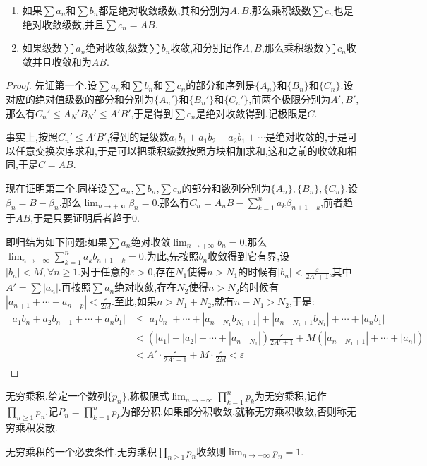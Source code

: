\begin{enumerate}
	\item 如果$\sum a_n$和$\sum b_n$都是绝对收敛级数,其和分别为$A,B$,那么乘积级数$\sum c_n$也是绝对收敛级数,并且$\sum c_n=AB$.
	\item 如果级数$\sum a_n$绝对收敛,级数$\sum b_n$收敛,和分别记作$A,B$,那么乘积级数$\sum c_n$收敛并且收敛和为$AB$.
\end{enumerate}
\begin{proof}
	
	先证第一个.设$\sum a_n$和$\sum b_n$和$\sum c_n$的部分和序列是$\{A_n\}$和$\{B_n\}$和$\{C_n\}$.设对应的绝对值级数的部分和分别为$\{A_n'\}$和$\{B_n'\}$和$\{C_n'\}$,前两个极限分别为$A',B'$,那么有$C_n'\le A_N'B_N'\le A'B'$,于是得到$\sum c_n$是绝对收敛得到.记极限是$C$.
	
	事实上,按照$C_n'\le A'B'$,得到的是级数$a_1b_1+a_1b_2+a_2b_1+\cdots$是绝对收敛的,于是可以任意交换次序求和,于是可以把乘积级数按照方块相加求和,这和之前的收敛和相同,于是$C=AB$.
	
	现在证明第二个.同样设$\sum a_n$,$\sum b_n$,$\sum c_n$的部分和数列分别为$\{A_n\},\{B_n\},\{C_n\}$.设$\beta_n=B-\beta_n$,那么$\lim_{n\to+\infty}\beta_n=0$.那么有$C_n=A_nB-\sum_{k=1}^{n}a_k\beta_{n+1-k}$,前者趋于$AB$,于是只要证明后者趋于0.
	
	即归结为如下问题:如果$\sum a_n$绝对收敛$\lim_{n\to+\infty}b_n=0$,那么$\lim_{n\to+\infty}\sum_{k=1}^{n}a_kb_{n+1-k}=0$.为此,先按照$b_n$收敛得到它有界,设$|b_n|<M,\forall n\ge1$.对于任意的$\varepsilon>0$,存在$N_1$使得$n>N_1$的时候有$|b_n|<\frac{\varepsilon}{2A'+1}$,其中$A'=\sum |a_n|$.再按照$\sum a_n$绝对收敛,存在$N_2$使得$n>N_2$的时候有$|a_{n+1}+\cdots+a_{n+p}|<\frac{\varepsilon}{2M}$.至此,如果$n>N_1+N_2$,就有$n-N_1>N_2$,于是:
	\begin{align*}
	|a_1b_n+a_2b_{n-1}+\cdots+a_nb_1| &\le|a_1b_n|+\cdots+|a_{n-N_1}b_{N_1+1}|+|a_{n-N_1+1}b_{N_1}|+\cdots+|a_nb_1| \\
	&<(|a_1|+|a_2|+\cdots+|a_{n-N_1}|)\frac{\varepsilon}{2A'+1}+M\left(|a_{n-N_1+1}|+\cdots+|a_n|\right)  \\
	&<A'\cdot\frac{\varepsilon}{2A'+1}+M\cdot\frac{\varepsilon}{2M}<\varepsilon
	\end{align*}
\end{proof}

无穷乘积.给定一个数列$\{p_n\}$,称极限式$\lim_{n\to+\infty}\prod_{k=1}^np_k$为无穷乘积,记作$\prod_{n\ge1}p_n$.记$P_n=\prod_{k=1}^np_k$为部分积.如果部分积收敛,就称无穷乘积收敛,否则称无穷乘积发散.

无穷乘积的一个必要条件.无穷乘积$\prod_{n\ge1}p_n$收敛则$\lim_{n\to+\infty}p_n=1$.

